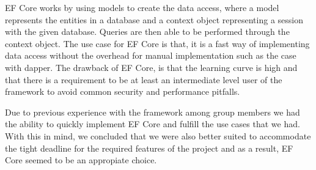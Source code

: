 EF Core works by using models to create the data access, where a model represents the entities in a database and a context object representing a session with the given database. Queries are then able to be performed through the context object. 
The use case for EF Core is that, it is a fast way of implementing data access without the overhead for manual implementation such as the case with dapper. 
The drawback of EF Core, is that the learning curve is high and that there is a requirement to be at least an intermediate level user of the framework to avoid common security and performance pitfalls. \cite{EFCore}

Due to previous experience with the framework among group members we had the ability to quickly implement EF Core and fulfill the use cases that we had. With this in mind, we concluded that we were also better suited to accommodate the tight deadline for the required features of the \knox{} project and as a result, EF Core seemed to be an appropiate choice.


